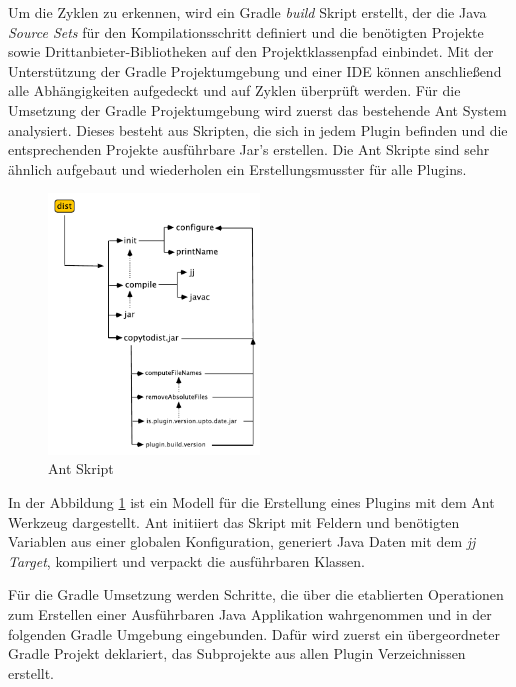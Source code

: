  	Um die Zyklen zu erkennen, wird ein Gradle \textit{build} Skript erstellt, der die Java \textit{Source Sets} für den Kompilationsschritt definiert und die benötigten Projekte sowie Drittanbieter-Bibliotheken auf den Projektklassenpfad einbindet. Mit der Unterstützung der Gradle Projektumgebung und einer IDE können anschließend alle Abhängigkeiten aufgedeckt und auf Zyklen überprüft werden. \newline
 	Für die Umsetzung der Gradle Projektumgebung wird zuerst das bestehende Ant System analysiert. Dieses besteht aus Skripten, die sich in jedem Plugin befinden und die entsprechenden Projekte ausführbare Jar's erstellen. Die Ant Skripte sind sehr ähnlich aufgebaut und wiederholen ein Erstellungsmusster für alle Plugins. \newline
	\begin{figure}[h!]
	  \centering
	  \includegraphics[width=0.5\textwidth]{material/images/ant-build.pdf}
	  \caption{Ant Skript}
	  \label{fig:antscript}
	\end{figure}

	In der Abbildung \ref{fig:antscript} ist ein Modell für die Erstellung eines Plugins mit dem Ant Werkzeug dargestellt. Ant initiiert das Skript mit Feldern und benötigten Variablen aus einer globalen Konfiguration, generiert Java Daten mit dem \textit{jj Target}, kompiliert und verpackt die ausführbaren Klassen. \bigbreak
	
	Für die Gradle Umsetzung werden Schritte, die über die etablierten Operationen zum Erstellen einer Ausführbaren Java Applikation wahrgenommen und in der folgenden Gradle Umgebung eingebunden.\newline
	Dafür wird zuerst ein übergeordneter Gradle Projekt deklariert, das Subprojekte aus allen Plugin Verzeichnissen erstellt.\bigbreak

